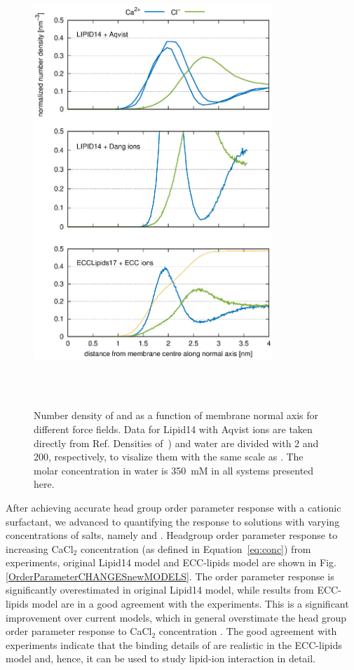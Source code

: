 \documentclass[aip,jcp,twocolumn]{revtex4}
\begin{document}
\begin{figure}[tbp]
  \centering
  \includegraphics[width=9.0cm,angle=0]{../Fig/CAdensities2.eps}
  \caption{\label{fig:cacl-dens}
    Number density of  and  as a function of membrane normal axis
    for different force fields. Data for Lipid14 with Aqvist ions are taken directly from Ref. 
    Densities of~) and water are divided with 2 and 200, respectively, to visalize them
    with the same scale as . The molar concentration in water is 350~mM in all systems
    presented here. 
    }
   \\
   \\
\end{figure}

After achieving accurate head group order parameter response with a cationic surfactant, 
we advanced to quantifying the response to solutions with varying concentrations of salts, namely  and . 
Headgroup order parameter response to increasing CaCl$_2$ concentration
(as defined in Equation~\ref{eq:conc})
from experiments, original Lipid14 model and ECC-lipids model are shown
in Fig. \ref{OrderParameterCHANGESnewMODELS}. The order parameter response
is significantly overestimated in original Lipid14 model, while results from
ECC-lipids model are in a good agreement with the experiments.
This is a significant improvement over current models,
which in general overstimate the head group order parameter response to CaCl$_2$
concentration \cite{catte16}. The good agreement with experiments indicate
that the binding details of  are realistic in the ECC-lipids model
and, hence, it can be used to study lipid-ion interaction in detail.
\end{document}
